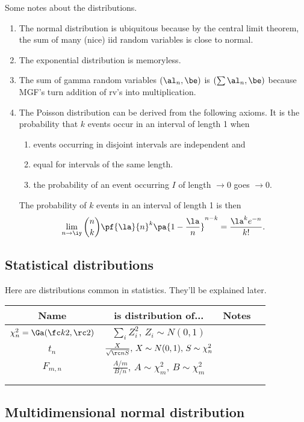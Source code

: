 Some notes about the distributions.
\begin{enumerate}
\item The normal distribution is ubiquitous because by the central limit theorem, the sum of many (nice) iid random variables is close to normal.
\item The exponential distribution is memoryless.
\item The sum of gamma random variables $(\al_n,\be)$ is $(\sum\al_n,\be)$ because MGF's turn addition of rv's into multiplication.
\item The Poisson distribution can be derived from the following axioms. It is the probability that $k$ events occur in an interval of length 1 when
\begin{enumerate}
\item
events occurring in disjoint intervals are independent and 
\item 
equal for intervals of the same length.
\item
the probability of an event occurring $I$ of length $\to 0$ goes $\to 0$.
\end{enumerate}
The probability of $k$ events in an interval of length 1 is then 
\[
\lim_{n\to \iy}\binom nk \pf{\la}{n}^k\pa{1-\frac{\la}{n}}^{n-k}= \frac{\la^k e^{-n}}{k!}.
\]
\end{enumerate}

\subsection{Statistical distributions}

Here are distributions common in statistics. They'll be explained later.

\begin{tabular}{|c|c|c|c|}
\hline 
Name & is distribution of... & Notes & \tabularnewline
\hline 
\textbf{$\chi_{n}^{2}=\Ga(\fc k2,\rc2)$} & $\sum_{i}Z_{i}^{2},\, Z_{i}\sim N(0,1)$ &  & \tabularnewline
\hline 
$t_{n}$ & $\frac{X}{\sqrt{\rc nS}},\,X\sim  N(0,1), \,S\sim \chi_{n}^{2}$ &  & \tabularnewline
\hline 
$F_{m,n}$ & $\frac{A/m}{B/n},\,A\sim \chi_{m}^{2},\,B \sim\chi_{m}^{2}$ &  & \tabularnewline
\hline 
 &  &  & \tabularnewline
\hline 
 &  &  & \tabularnewline
\hline 
\end{tabular}

\subsection{Multidimensional normal distribution}

